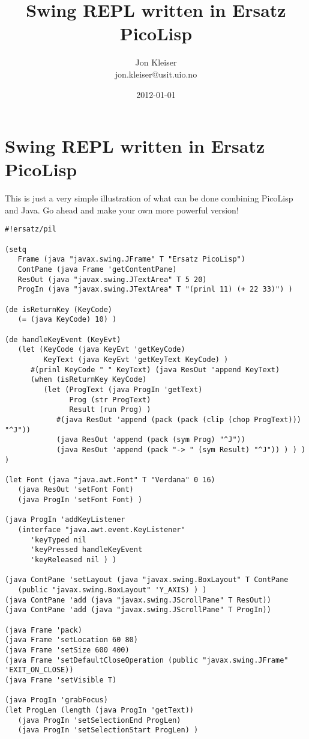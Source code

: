 \documentclass[10pt,a4paper]{article}
\title{Swing REPL written in Ersatz PicoLisp}
\author{Jon Kleiser\\jon.kleiser@usit.uio.no}
\date{2012-01-01}
\begin{document}
\maketitle

\section*{Swing REPL written in Ersatz PicoLisp}
This is just a very simple illustration of what can be done combining PicoLisp and Java.
Go ahead and make your own more powerful version!

\begin{verbatim}
#!ersatz/pil

(setq
   Frame (java "javax.swing.JFrame" T "Ersatz PicoLisp")
   ContPane (java Frame 'getContentPane)
   ResOut (java "javax.swing.JTextArea" T 5 20)
   ProgIn (java "javax.swing.JTextArea" T "(prinl 11) (+ 22 33)") )

(de isReturnKey (KeyCode)
   (= (java KeyCode) 10) )

(de handleKeyEvent (KeyEvt)
   (let (KeyCode (java KeyEvt 'getKeyCode)
         KeyText (java KeyEvt 'getKeyText KeyCode) )
      #(prinl KeyCode " " KeyText) (java ResOut 'append KeyText)
      (when (isReturnKey KeyCode)
         (let (ProgText (java ProgIn 'getText)
               Prog (str ProgText)
               Result (run Prog) )
            #(java ResOut 'append (pack (pack (clip (chop ProgText))) "^J"))
            (java ResOut 'append (pack (sym Prog) "^J"))
            (java ResOut 'append (pack "-> " (sym Result) "^J")) ) ) ) )

(let Font (java "java.awt.Font" T "Verdana" 0 16)
   (java ResOut 'setFont Font)
   (java ProgIn 'setFont Font) )

(java ProgIn 'addKeyListener
   (interface "java.awt.event.KeyListener"
      'keyTyped nil
      'keyPressed handleKeyEvent
      'keyReleased nil ) )

(java ContPane 'setLayout (java "javax.swing.BoxLayout" T ContPane
   (public "javax.swing.BoxLayout" 'Y_AXIS) ) )
(java ContPane 'add (java "javax.swing.JScrollPane" T ResOut))
(java ContPane 'add (java "javax.swing.JScrollPane" T ProgIn))

(java Frame 'pack)
(java Frame 'setLocation 60 80)
(java Frame 'setSize 600 400)
(java Frame 'setDefaultCloseOperation (public "javax.swing.JFrame" 'EXIT_ON_CLOSE))
(java Frame 'setVisible T)

(java ProgIn 'grabFocus)
(let ProgLen (length (java ProgIn 'getText))
   (java ProgIn 'setSelectionEnd ProgLen)
   (java ProgIn 'setSelectionStart ProgLen) )
\end{verbatim}
\end{document}
